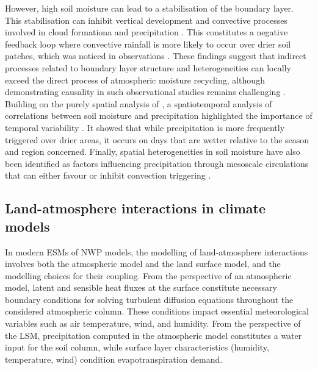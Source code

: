 However, high soil moisture can lead to a stabilisation of the boundary layer. %
This stabilisation can inhibit vertical development and convective processes involved in cloud formationa and precipitation \citep{findell_atmospheric_2003-1, ek_influence_2004}. 
This constitutes a negative feedback loop where convective rainfall is more likely to occur over drier soil patches, which was noticed in observations \citep{taylor_afternoon_2012, klein_dry_2020}. These findings suggest that indirect processes related to boundary layer structure and heterogeneities can locally exceed the direct process of atmospheric moisture recycling, although demonstrating causality in such observational studies remains challenging \citep{salvucci_investigating_2002, guillod_land-surface_2014}. Building on the purely spatial analysis of \citet{taylor_afternoon_2012}, a spatiotemporal analysis of correlations between soil moisture and precipitation highlighted the importance of temporal variability \citep{guillod_reconciling_2015}. It showed that while precipitation is more frequently triggered over drier areas, it occurs on days that are wetter relative to the season and region concerned.
Finally, spatial heterogeneities in soil moisture have also been identified as factors influencing precipitation through mesoscale circulations that can either favour or inhibit convection triggering \citep{findell_atmospheric_2003, taylor_frequency_2011, rochetin_morphology_2017}.

\subsection{Land-atmosphere interactions in climate models}

In modern ESMs of NWP models, the modelling of land-atmosphere interactions involves both the atmospheric model and the land surface model, and the modelling choices for their coupling.
From the perspective of an atmospheric model, latent and sensible heat fluxes at the surface constitute necessary boundary conditions for solving turbulent diffusion equations throughout the considered atmospheric column. These conditions impact essential meteorological variables such as air temperature, wind, and humidity. From the perspective of the LSM, precipitation computed in the atmospheric model constitutes a water input for the soil column, while surface layer characteristics (humidity, temperature, wind) condition evapotranspiration demand.

